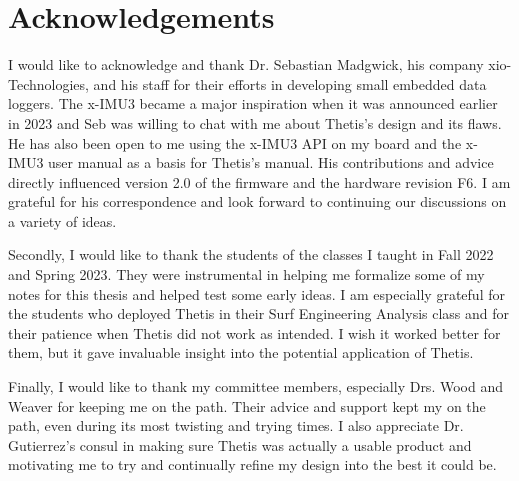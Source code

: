 \chapter*{Acknowledgements}

I would like to acknowledge and thank Dr. Sebastian Madgwick, his company xio-Technologies, and his staff for their efforts in developing small embedded data loggers.
The x-IMU3 became a major inspiration when it was announced earlier in 2023 and Seb was willing to chat with me about Thetis's design and its flaws.
He has also been open to me using the x-IMU3 API on my board and the x-IMU3 user manual as a basis for Thetis's manual.
His contributions and advice directly influenced version 2.0 of the firmware and the hardware revision F6.
I am grateful for his correspondence and look forward to continuing our discussions on a variety of ideas.

Secondly, I would like to thank the students of the classes I taught in Fall 2022 and Spring 2023.
They were instrumental in helping me formalize some of my notes for this thesis and helped test some early ideas.
I am especially grateful for the students who deployed Thetis in their Surf Engineering Analysis class and for their patience when Thetis did not work as intended.
I wish it worked better for them, but it gave invaluable insight into the potential application of Thetis.

Finally, I would like to thank my committee members, especially Drs. Wood and Weaver for keeping me on the path.
Their advice and support kept my on the path, even during its most twisting and trying times.
I also appreciate Dr. Gutierrez's consul in making sure Thetis was actually a usable product and motivating me to try and continually refine my design into the best it could be.
